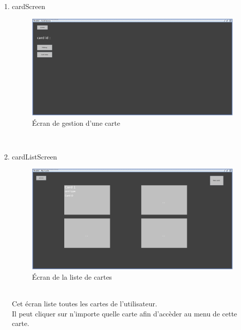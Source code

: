 \documentclass[../rapport.tex]{subfiles}
\begin{document}
\begin{enumerate}
	\item{cardScreen}\\
	\begin{figure}[h!]
		\centering\includegraphics[scale=0.15]{ressources/photos_diagrammes/extensionTheo/gui1/CardScene.jpg}
		\caption{Écran de gestion d'une carte}
	\end{figure}\\

	\item{cardListScreen}\\
	\begin{figure}[h!]
		\centering\includegraphics[scale=0.15]{ressources/photos_diagrammes/extensionTheo/gui1/CardsListScreen.jpg}
		\caption{Écran de la liste de cartes}
	\end{figure}\\
Cet écran liste toutes les cartes de l'utilisateur.\\
Il peut cliquer sur n'importe quelle carte afin d'accèder au menu de cette carte.


\end{enumerate}
\end{document}
